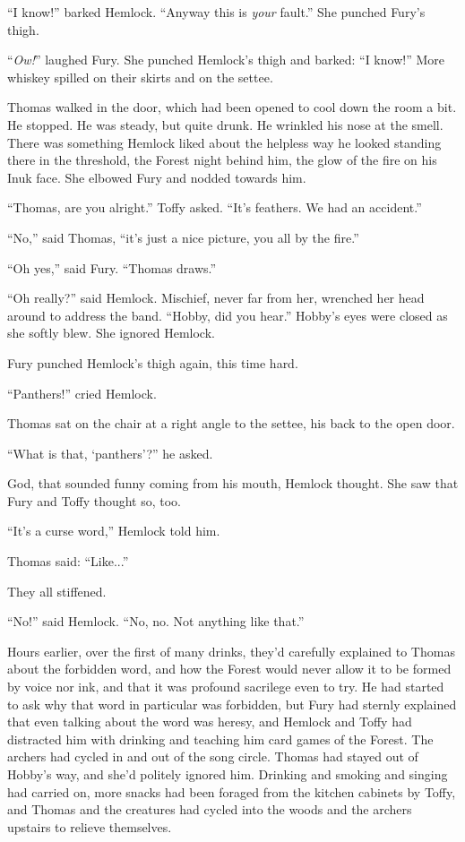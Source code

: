 \documentclass[11pt,a5paper]{article}
\begin{document}
``I know!'' barked Hemlock. ``Anyway this is \emph{your} fault.'' She punched Fury's thigh.

``\emph{Ow!}'' laughed Fury. She punched Hemlock's thigh and barked: ``I know!'' More whiskey spilled on their skirts and on the settee.

Thomas walked in the door, which had been opened to cool down the room a bit. He stopped. He was steady, but quite drunk. He wrinkled his nose at the smell. There was something Hemlock liked about the helpless way he looked standing there in the threshold, the Forest night behind him, the glow of the fire on his Inuk face. She elbowed Fury and nodded towards him.

``Thomas, are you alright.'' Toffy asked. ``It's feathers. We had an accident.''

``No,'' said Thomas, ``it's just a nice picture, you all by the fire.''

``Oh yes,'' said Fury. ``Thomas draws.''

``Oh really?'' said Hemlock. Mischief, never far from her, wrenched her head around to address the band. ``Hobby, did you hear.'' Hobby's eyes were closed as she softly blew. She ignored Hemlock.

Fury punched Hemlock's thigh again, this time hard.

``Panthers!'' cried Hemlock.

Thomas sat on the chair at a right angle to the settee, his back to the open door.

``What is that, `panthers'?'' he asked.

God, that sounded funny coming from his mouth, Hemlock thought. She saw that Fury and Toffy thought so, too.

``It's a curse word,'' Hemlock told him.

Thomas said: ``Like...''

They all stiffened.

``No!'' said Hemlock. ``No, no. Not anything like that.''

Hours earlier, over the first of many drinks, they'd carefully explained to Thomas about the forbidden word, and how the Forest would never allow it to be formed by voice nor ink, and that it was profound sacrilege even to try. He had started to ask why that word in particular was forbidden, but Fury had sternly explained that even talking about the word was heresy, and Hemlock and Toffy had distracted him with drinking and teaching him card games of the Forest. The archers had cycled in and out of the song circle. Thomas had stayed out of Hobby's way, and she'd politely ignored him. Drinking and smoking and singing had carried on, more snacks had been foraged from the kitchen cabinets by Toffy, and Thomas and the creatures had cycled into the woods and the archers upstairs to relieve themselves.
\end{document}
